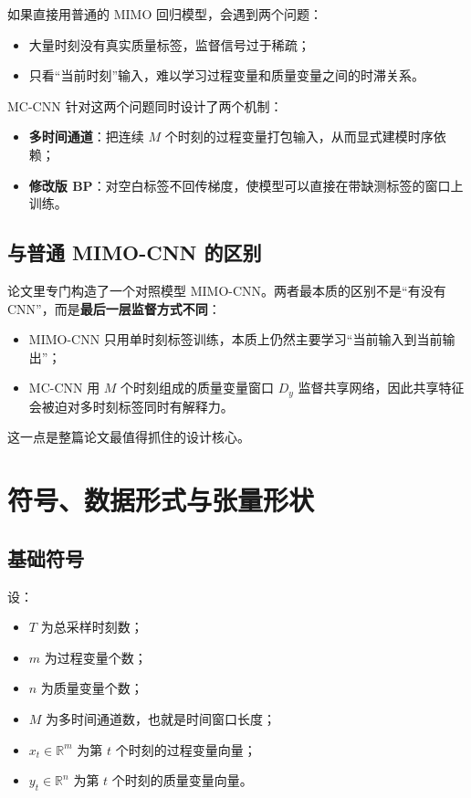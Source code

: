 \documentclass[UTF8]{ctexart}
\begin{document}
如果直接用普通的 MIMO 回归模型，会遇到两个问题：
\begin{itemize}
    \item 大量时刻没有真实质量标签，监督信号过于稀疏；
    \item 只看“当前时刻”输入，难以学习过程变量和质量变量之间的时滞关系。
\end{itemize}

MC-CNN 针对这两个问题同时设计了两个机制：
\begin{itemize}
    \item \textbf{多时间通道}：把连续 $M$ 个时刻的过程变量打包输入，从而显式建模时序依赖；
    \item \textbf{修改版 BP}：对空白标签不回传梯度，使模型可以直接在带缺测标签的窗口上训练。
\end{itemize}

\subsection{与普通 MIMO-CNN 的区别}

论文里专门构造了一个对照模型 MIMO-CNN。两者最本质的区别不是“有没有 CNN”，而是\textbf{最后一层监督方式不同}：
\begin{itemize}
    \item MIMO-CNN 只用单时刻标签训练，本质上仍然主要学习“当前输入到当前输出”；
    \item MC-CNN 用 $M$ 个时刻组成的质量变量窗口 $D_y$ 监督共享网络，因此共享特征会被迫对多时刻标签同时有解释力。
\end{itemize}

这一点是整篇论文最值得抓住的设计核心。

\section{符号、数据形式与张量形状}

\subsection{基础符号}

设：
\begin{itemize}
    \item $T$ 为总采样时刻数；
    \item $m$ 为过程变量个数；
    \item $n$ 为质量变量个数；
    \item $M$ 为多时间通道数，也就是时间窗口长度；
    \item $x_t \in \mathbb{R}^{m}$ 为第 $t$ 个时刻的过程变量向量；
    \item $y_t \in \mathbb{R}^{n}$ 为第 $t$ 个时刻的质量变量向量。
\end{itemize}
\end{document}
